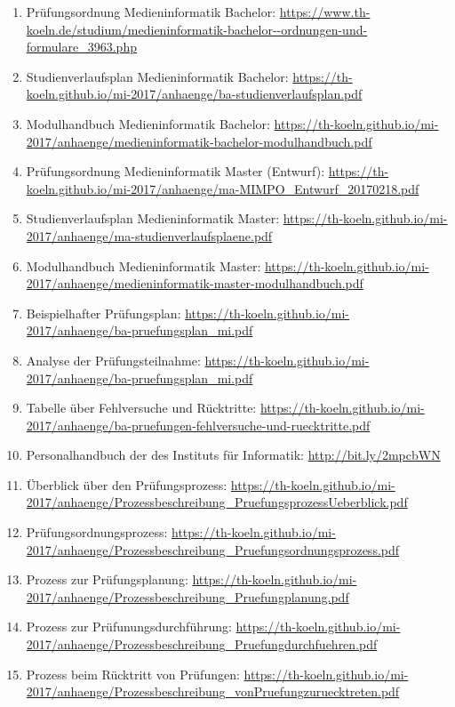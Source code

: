 \documentclass[BCOR12mm,DIV11,titlepage,a4paper,oneside,10pt]{scrbook}
\begin{document}
\begin{sloppypar}
\begin{flushleft}
\begin{enumerate}
\item{Prüfungsordnung Medieninformatik Bachelor: \url{https://www.th-koeln.de/studium/medieninformatik-bachelor--ordnungen-und-formulare\_3963.php} } 
\item{Studienverlaufsplan Medieninformatik Bachelor: \url{https://th-koeln.github.io/mi-2017/anhaenge/ba-studienverlaufsplan.pdf} } 
\item{Modulhandbuch Medieninformatik Bachelor: \url{https://th-koeln.github.io/mi-2017/anhaenge/medieninformatik-bachelor-modulhandbuch.pdf} } 
\item{Prüfungsordnung Medieninformatik Master (Entwurf): \url{https://th-koeln.github.io/mi-2017/anhaenge/ma-MIMPO\_Entwurf\_20170218.pdf} } 
\item{Studienverlaufsplan Medieninformatik Master: \url{https://th-koeln.github.io/mi-2017/anhaenge/ma-studienverlaufsplaene.pdf} } 
\item{Modulhandbuch Medieninformatik Master: \url{https://th-koeln.github.io/mi-2017/anhaenge/medieninformatik-master-modulhandbuch.pdf} } 
\item{Beispielhafter Prüfungsplan: \url{https://th-koeln.github.io/mi-2017/anhaenge/ba-pruefungsplan\_mi.pdf} } 
\item{Analyse der Prüfungsteilnahme: \url{https://th-koeln.github.io/mi-2017/anhaenge/ba-pruefungsplan\_mi.pdf} } 
\item{Tabelle über Fehlversuche und Rücktritte: \url{https://th-koeln.github.io/mi-2017/anhaenge/ba-pruefungen-fehlversuche-und-ruecktritte.pdf} } 
\item{Personalhandbuch der des Instituts für Informatik: \url{http://bit.ly/2mpcbWN} } 
\item{Überblick über den Prüfungsprozess: \url{https://th-koeln.github.io/mi-2017/anhaenge/Prozessbeschreibung\_PruefungsprozessUeberblick.pdf} } 
\item{Prüfungsordnungsprozess: \url{https://th-koeln.github.io/mi-2017/anhaenge/Prozessbeschreibung\_Pruefungsordnungsprozess.pdf} } 
\item{Prozess zur Prüfungsplanung: \url{https://th-koeln.github.io/mi-2017/anhaenge/Prozessbeschreibung\_Pruefungplanung.pdf} } 
\item{Prozess zur Prüfunungsdurchführung: \url{https://th-koeln.github.io/mi-2017/anhaenge/Prozessbeschreibung\_Pruefungdurchfuehren.pdf} } 
\item{Prozess beim Rücktritt von Prüfungen: \url{https://th-koeln.github.io/mi-2017/anhaenge/Prozessbeschreibung\_vonPruefungzuruecktreten.pdf} } 

\end{enumerate}
\end{flushleft}
\end{sloppypar}
\end{document}
